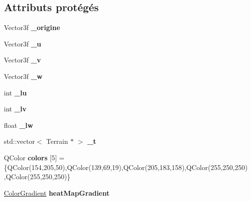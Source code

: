 \subsection*{Attributs protégés}
\begin{DoxyCompactItemize}
\item 
\hypertarget{class_camera_a1a6ee6428d4087c286f2443a1605cb16}{}Vector3f {\bfseries \+\_\+origine}\label{class_camera_a1a6ee6428d4087c286f2443a1605cb16}

\item 
\hypertarget{class_camera_a613c0f2daa3b5a8e3fecfd60967d3d4b}{}Vector3f {\bfseries \+\_\+u}\label{class_camera_a613c0f2daa3b5a8e3fecfd60967d3d4b}

\item 
\hypertarget{class_camera_a3b572603ea0aedb7c20acd8fd93c0a2a}{}Vector3f {\bfseries \+\_\+v}\label{class_camera_a3b572603ea0aedb7c20acd8fd93c0a2a}

\item 
\hypertarget{class_camera_a2b14e23c7d3b051b45164df1ade06592}{}Vector3f {\bfseries \+\_\+w}\label{class_camera_a2b14e23c7d3b051b45164df1ade06592}

\item 
\hypertarget{class_camera_af1074fd7009c6d72ab5ddaed9513b5a4}{}int {\bfseries \+\_\+lu}\label{class_camera_af1074fd7009c6d72ab5ddaed9513b5a4}

\item 
\hypertarget{class_camera_a38516b7c77ef5d99b47072290455fae7}{}int {\bfseries \+\_\+lv}\label{class_camera_a38516b7c77ef5d99b47072290455fae7}

\item 
\hypertarget{class_camera_ab07d1a06bc79f9e9b90296a326a84d18}{}float {\bfseries \+\_\+lw}\label{class_camera_ab07d1a06bc79f9e9b90296a326a84d18}

\item 
\hypertarget{class_camera_a74a74ef67d849163bf2a090533bc96f8}{}std\+::vector$<$ Terrain $\ast$ $>$ {\bfseries \+\_\+t}\label{class_camera_a74a74ef67d849163bf2a090533bc96f8}

\item 
\hypertarget{class_camera_a22b9c85b9b9a9c9bfaaebbf33224033a}{}Q\+Color {\bfseries colors} \mbox{[}5\mbox{]} =\{Q\+Color(154,205,50),Q\+Color(139,69,19),Q\+Color(205,183,158),Q\+Color(255,250,250),Q\+Color(255,250,250)\}\label{class_camera_a22b9c85b9b9a9c9bfaaebbf33224033a}

\item 
\hypertarget{class_camera_a84f4e1150c0f2588bc1cf530c8bfecd8}{}\hyperlink{class_color_gradient}{Color\+Gradient} {\bfseries heat\+Map\+Gradient}\label{class_camera_a84f4e1150c0f2588bc1cf530c8bfecd8}

\end{DoxyCompactItemize}


